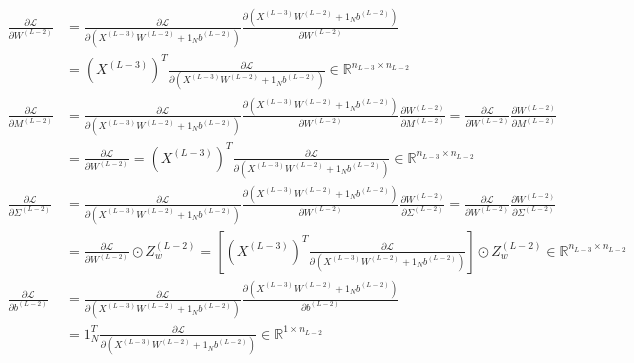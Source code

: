 \documentclass[11pt,a4paper]{article}
\def\mathbf#1{#1}%
\theoremstyle{plain}
\theoremstyle{definition}
\theoremstyle{remark}
\begin{document}
\begin{align}
    \frac{\partial \mathcal{L}}{\partial W^{(L-2)}} &= \frac{\partial \mathcal{L}}{\partial \left( X^{(L-3)} W^{(L-2)} + \mathbf{1}_N \mathbf{b}^{(L-2)} \right)} \frac{\partial \left( X^{(L-3)} W^{(L-2)} + \mathbf{1}_N \mathbf{b}^{(L-2)} \right)}{\partial W^{(L-2)}} \nonumber \\
    &= \left( X^{(L-3)} \right)^T \frac{\partial \mathcal{L}}{\partial \left( X^{(L-3)} W^{(L-2)} + \mathbf{1}_N \mathbf{b}^{(L-2)} \right)} \in \mathbb{R}^{n_{L-3} \times n_{L-2}} \\[0.2em]
    \frac{\partial \mathcal{L}}{\partial M^{(L-2)}} &= \frac{\partial \mathcal{L}}{\partial \left( X^{(L-3)} W^{(L-2)} + \mathbf{1}_N \mathbf{b}^{(L-2)} \right)} \frac{\partial \left( X^{(L-3)} W^{(L-2)} + \mathbf{1}_N \mathbf{b}^{(L-2)} \right)}{\partial W^{(L-2)}} \frac{\partial W^{(L-2)}}{\partial M^{(L-2)}} = \frac{\partial \mathcal{L}}{\partial W^{(L-2)}} \frac{\partial W^{(L-2)}}{\partial M^{(L-2)}} \nonumber \\
    &= \frac{\partial \mathcal{L}}{\partial W^{(L-2)}} = \left( X^{(L-3)} \right)^T \frac{\partial \mathcal{L}}{\partial \left( X^{(L-3)} W^{(L-2)} + \mathbf{1}_N \mathbf{b}^{(L-2)} \right)} \in \mathbb{R}^{n_{L-3} \times n_{L-2}} \\[0.2em]
    \frac{\partial \mathcal{L}}{\partial \Sigma^{(L-2)}} &= \frac{\partial \mathcal{L}}{\partial \left( X^{(L-3)} W^{(L-2)} + \mathbf{1}_N \mathbf{b}^{(L-2)} \right)} \frac{\partial \left( X^{(L-3)} W^{(L-2)} + \mathbf{1}_N \mathbf{b}^{(L-2)} \right)}{\partial W^{(L-2)}} \frac{\partial W^{(L-2)}}{\partial \Sigma^{(L-2)}} = \frac{\partial \mathcal{L}}{\partial W^{(L-2)}} \frac{\partial W^{(L-2)}}{\partial \Sigma^{(L-2)}} \nonumber \\
    &= \frac{\partial \mathcal{L}}{\partial W^{(L-2)}} \odot Z_w^{(L-2)} = \left[ \left( X^{(L-3)} \right)^T \frac{\partial \mathcal{L}}{\partial \left( X^{(L-3)} W^{(L-2)} + \mathbf{1}_N \mathbf{b}^{(L-2)} \right)} \right] \odot Z_w^{(L-2)} \in \mathbb{R}^{n_{L-3} \times n_{L-2}} \\[0.2em]
    \frac{\partial \mathcal{L}}{\partial \mathbf{b}^{(L-2)}} &= \frac{\partial \mathcal{L}}{\partial \left( X^{(L-3)} W^{(L-2)} + \mathbf{1}_N \mathbf{b}^{(L-2)} \right)} \frac{\partial \left( X^{(L-3)} W^{(L-2)} + \mathbf{1}_N \mathbf{b}^{(L-2)} \right)}{\partial \mathbf{b}^{(L-2)}} \nonumber \\
    &= \mathbf{1}_N^T \frac{\partial \mathcal{L}}{\partial \left( X^{(L-3)} W^{(L-2)} + \mathbf{1}_N \mathbf{b}^{(L-2)} \right)} \in \mathbb{R}^{1 \times n_{L-2}}
\end{align}
\end{document}
